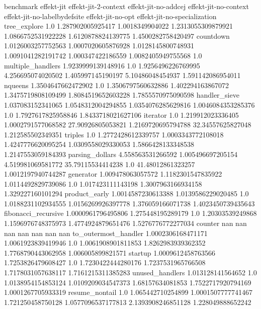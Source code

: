 benchmark	effekt-jit	effekt-jit-2-context	effekt-jit-no-addcej	effekt-jit-no-context	effekt-jit-no-labelbydefsite	effekt-jit-no-opt	effekt-jit-no-specialization
tree_explore	1.0	1.287902005925417	1.0018349904022	1.2313055309879921	1.0866752531922228	1.6120878824139775	1.4500282758420497
countdown	1.0126003257752563	1.0007020605876928	1.0128145800748931	1.0091041282191742	1.000347422186559	1.0082405949755568	1.0
multiple_handlers	1.9239999139148916	1.0	1.9256496226769995	4.256695074020502	1.405997145190197	5.10486048454937	1.591142086954011
nqueens	1.3504647662472902	1.0	1.3506797560632886	1.402294163867072	1.3475719808109499	1.8084519652603228	1.7855570975090598
handler_sieve	1.037083152341065	1.0548312004294855	1.0354076285629816	1.0046084353285376	1.0	1.7927617825958846	1.8433718021627106
iterator	1.0	1.219912023336405	1.0002791577068582	27.90926805053821	1.2169720695794788	32.34557625827048	1.212585502349351
triples	1.0	1.2772428612339757	1.0003343772108018	1.4247776620095254	1.0309558029330053	1.5866428133348538	1.2147553059184393
parsing_dollars	4.558563531266592	1.005496697205154	4.519981069581772	35.79115534414238	1.0	41.48012861323257	1.0012197940744287
generator	1.009478063057572	1.1182301547835922	1.0114492829739086	1.0	1.017423111143198	1.3007963166934158	1.329227160101294
product_early	1.0014587230613388	1.0139586229020485	1.0	1.0188231102934555	1.0156269926397778	1.376059166071738	1.4023450739435643
fibonacci_recursive	1.0000961796495806	1.275448195289179	1.0	1.20303539249868	1.1596976748375973	1.4774924879651476	1.5276776772277034
counter	nan	nan	nan	nan	nan	nan	nan
to_outermost_handler	1.0002306168471171	1.0061923839419946	1.0	1.0061908901811853	1.8262983939362352	1.7768790443062958	1.006005899821571
startup	1.0009612458763566	1.7253826479608427	1.0	1.7230422444280176	1.7237531965766508	1.7178031057638117	1.7161215311385283
unused_handlers	1.013128141564652	1.0	1.0138954154853124	1.0109209034547373	1.68157634081853	1.7522717920794169	1.0001267705933319
resume_nontail	1.0	1.065442710254899	1.0001507777741467	1.721250458750128	1.0577096537177813	2.1393908246851128	1.228049888652242